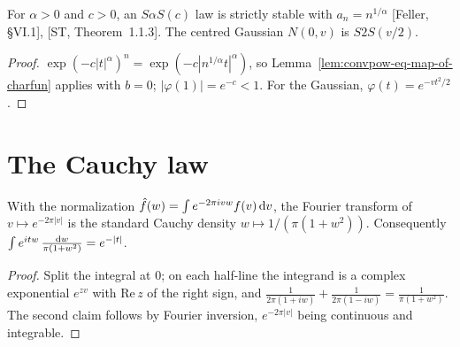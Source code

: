 \begin{theorem}
  \label{thm:symm-stable-strictly-stable}
  \leanok
  For $\alpha > 0$ and $c > 0$, an $S\alpha S(c)$ law is strictly stable with
  $a_n = n^{1/\alpha}$ [Feller, \S VI.1], [ST, Theorem~1.1.3]. The centred Gaussian $N(0, v)$ is
  $S2S(v/2)$.
\end{theorem}
\begin{proof}
  \leanok
  $\exp(-c|t|^\alpha)^n = \exp(-c |n^{1/\alpha} t|^\alpha)$, so
  Lemma~\ref{lem:convpow-eq-map-of-charfun} applies with $b = 0$; $|\varphi(1)| = e^{-c} < 1$.
  For the Gaussian, $\varphi(t) = e^{-v t^2/2}$.
\end{proof}

\section{The Cauchy law}

\begin{lemma}
  \label{lem:fourier-exp-abs}
  \leanok
  With the normalization $\hat f(w) = \int e^{-2\pi i v w} f(v) \, \mathrm{d} v$, the Fourier transform of
  $v \mapsto e^{-2\pi |v|}$ is the standard Cauchy density $w \mapsto 1/(\pi(1 + w^2))$.
  Consequently $\int e^{itw} \, \frac{\mathrm{d} w}{\pi(1 + w^2)} = e^{-|t|}$.
\end{lemma}
\begin{proof}
  \leanok
  Split the integral at $0$; on each half-line the integrand is a complex exponential
  $e^{z v}$ with $\mathrm{Re}\, z$ of the right sign, and
  $\frac{1}{2\pi(1 + iw)} + \frac{1}{2\pi(1 - iw)} = \frac{1}{\pi(1 + w^2)}$. The second claim
  follows by Fourier inversion, $e^{-2\pi|v|}$ being continuous and integrable.
\end{proof}

